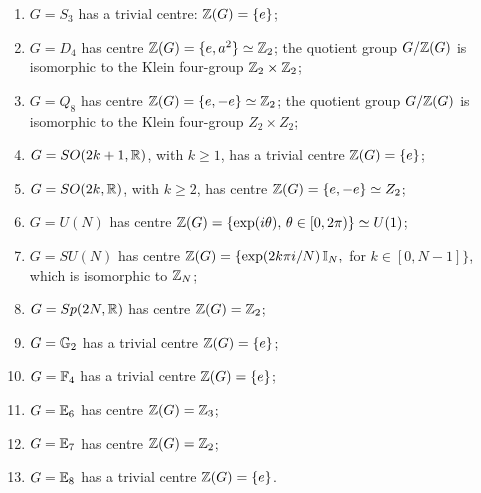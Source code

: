 \begin{enumerate}
    \item $G = S_3$ has a trivial centre: $\mathbb{Z}(G) = \{e\}$;
    \item $G = D_4$ has centre $\mathbb{Z}(G) = \{e, a^2\} \simeq \mathbb{Z}_2$; the quotient group $G/\mathbb{Z}(G)$ is isomorphic to the Klein four-group $\mathbb{Z}_2 \times \mathbb{Z}_2$;
    \item $G = Q_8$ has centre $\mathbb{Z}(G) = \{e, -e\} \simeq \mathbb{Z}_2$; the quotient group $G/\mathbb{Z}(G)$ is isomorphic to the Klein four-group $Z_2 \times Z_2$;
    \item $G = SO(2k+1, \mathbb{R})$, with $k \geq 1$, has a trivial centre $\mathbb{Z}(G) = \{e\}$;
    \item $G = SO(2k, \mathbb{R})$, with $k \geq 2$, has centre $\mathbb{Z}(G) = \{e, -e\} \simeq Z_2$;
    \item $G = U(N)$ has centre $\mathbb{Z}(G) = \{\exp(i\theta),\, \theta \in [0,2\pi)\} \simeq U(1)$;
    \item $G = SU(N)$ has centre $\mathbb{Z}(G) = \{\exp(2k\pi i/N)\,\mathbb{I}_N,$ for $k \in [0,N-1]\}$, which is isomorphic to $\mathbb{Z}_N$;
    \item $G = Sp(2N, \mathbb{R})$ has centre $\mathbb{Z}(G) = \mathbb{Z}_2$;
    \item $G = \mathbb{G}_2$ has a trivial centre $\mathbb{Z}(G) = \{e\}$;
    \item $G = \mathbb{F}_4$ has a trivial centre $\mathbb{Z}(G) = \{e\}$;
    \item $G = \mathbb{E}_6$ has centre $\mathbb{Z}(G) = \mathbb{Z}_3$;
    \item $G = \mathbb{E}_7$ has centre $\mathbb{Z}(G) = \mathbb{Z}_2$;
    \item $G = \mathbb{E}_8$ has a trivial centre $\mathbb{Z}(G) = \{e\}$.
\end{enumerate}

